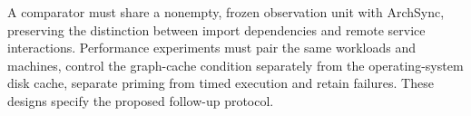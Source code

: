 A comparator must share a nonempty, frozen observation unit with ArchSync, preserving the distinction between import dependencies and remote service interactions. Performance experiments must pair the same workloads and machines, control the graph-cache condition separately from the operating-system disk cache, separate priming from timed execution and retain failures. These designs specify the proposed follow-up protocol.
